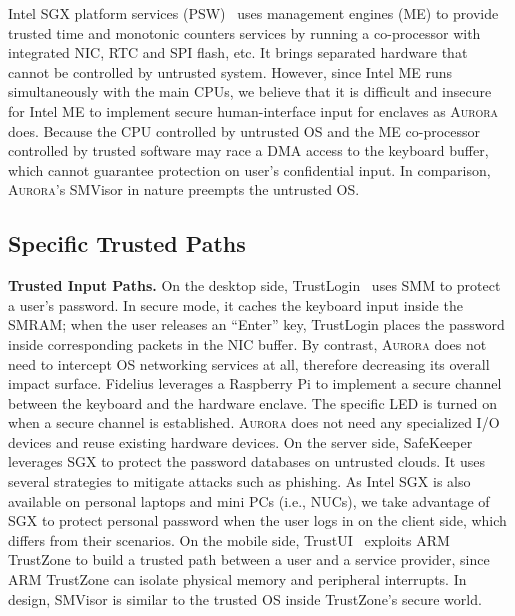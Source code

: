 Intel SGX platform services (PSW)~\cite{intel_psw} uses management engines (ME) to provide trusted time and monotonic counters services by running a co-processor with integrated NIC, RTC and SPI flash, etc. It brings separated hardware that cannot be controlled by untrusted system. However, since Intel ME runs simultaneously with the main CPUs, we believe that it is difficult and insecure for Intel ME to implement secure human-interface input for enclaves as \textsc{Aurora} does. Because the CPU controlled by untrusted OS and the ME co-processor controlled by trusted software may race a DMA access  to the keyboard buffer, which cannot guarantee protection on user's confidential input. In comparison, \textsc{Aurora}'s SMVisor in nature preempts the untrusted OS.

\subsection{Specific Trusted Paths}

\textbf{Trusted Input Paths.}
On the desktop side, TrustLogin~\cite{zhang_trustlogin:_2015} uses SMM to protect a user's password. In secure mode, it caches the keyboard input inside the SMRAM; when the user releases an “Enter” key, TrustLogin places the password inside corresponding packets in the NIC buffer. By contrast, \textsc{Aurora} does not need to intercept OS networking services at all, therefore decreasing its overall impact surface.
Fidelius \cite{DBLP:journals/corr/abs-1809-04774} leverages a Raspberry Pi to implement a secure channel between the keyboard and the hardware enclave. The specific LED is turned on when a secure channel is established.  \textsc{Aurora} does not need any specialized I/O devices and reuse existing hardware devices.
On the server side, SafeKeeper~\cite{DBLP:conf/www/KrawieckaKPMA18} leverages SGX to protect the password databases on untrusted clouds. It uses several strategies to mitigate attacks such as phishing. As Intel SGX is also available on personal laptops and mini PCs (i.e., NUCs), we take advantage of SGX to protect personal password when the user logs in on the client side, which differs from their scenarios.
On the mobile side, TrustUI~\cite{DBLP:conf/apsys/LiMHXZCL14} exploits ARM TrustZone to build a trusted path between a user and a service provider, since ARM TrustZone can isolate physical memory and peripheral interrupts. In design, SMVisor is similar to the trusted OS inside TrustZone's secure world.

